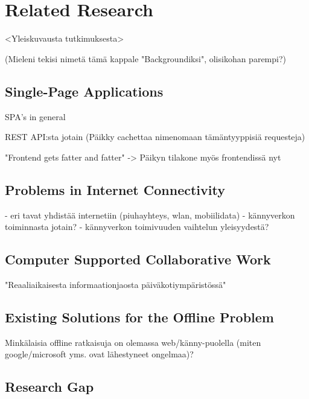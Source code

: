 
\chapter{Related Research}

<Yleiskuvausta tutkimuksesta>

(Mieleni tekisi nimetä tämä kappale "Backgroundiksi", olisikohan parempi?)


\section{Single-Page Applications}
SPA's in general

REST API:sta jotain (Päikky cachettaa nimenomaan tämäntyyppisiä requesteja)

"Frontend gets fatter and fatter" -> Päikyn tilakone myös frontendissä nyt


\section{Problems in Internet Connectivity}
 - eri tavat yhdistää internetiin (piuhayhteys, wlan, mobiilidata)
 - kännyverkon toiminnasta jotain?
 - kännyverkon toimivuuden vaihtelun yleisyydestä? 

 \section{Computer Supported Collaborative Work}
 "Reaaliaikaisesta informaationjaosta päiväkotiympäristössä"

\section{Existing Solutions for the Offline Problem}
Minkälaisia offline ratkaisuja on olemassa web/känny-puolella (miten google/microsoft yms. ovat lähestyneet ongelmaa)?


\section{Research Gap}
